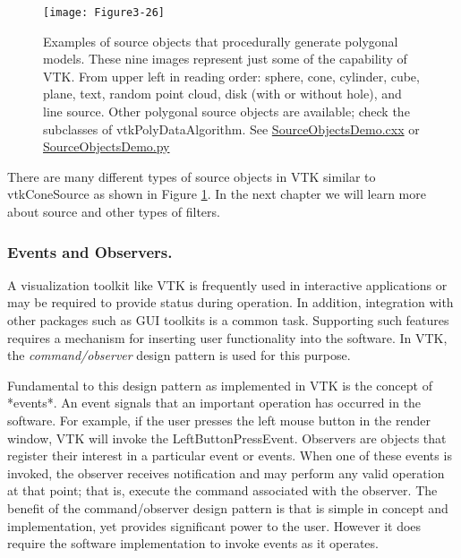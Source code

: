 \begin{figure}[!htb]
  \centering
  \texttt{[image: Figure3-26]}\\
  \caption{Examples of source objects that procedurally generate polygonal models. These nine images represent just some of the capability of VTK. From upper left in reading order: sphere, cone, cylinder, cube, plane, text, random point cloud, disk (with or without hole), and line source. Other polygonal source objects are available; check the subclasses of vtkPolyDataAlgorithm. See  \href{https://lorensen.github.io/VTKExamples/site/Cxx/GeometricObjects/SourceObjectsDemo/}{SourceObjectsDemo.cxx} or \href{https://lorensen.github.io/VTKExamples/site/Python/GeometricObjects/SourceObjectsDemo/}{SourceObjectsDemo.py}}\label{fig:Figure3-26}
\end{figure}

There are many different types of source objects in VTK similar to vtkConeSource as shown in Figure \ref{fig:Figure3-26}. In the next chapter we will learn more about source and other types of filters.

\subsubsection{Events and Observers.}
\label{sub:events_obdervers}
A visualization toolkit like VTK is frequently used in interactive applications or may be required to provide status during operation. In addition, integration with other packages such as GUI toolkits is a common task. Supporting such features requires a mechanism for inserting user functionality into the software. In VTK, the \emph{command/observer} design pattern \cite{Gamma95} is used for this purpose.

Fundamental to this design pattern as implemented in VTK is the concept of *events*. An event signals that an important operation has occurred in the software. For example, if the user presses the left mouse button in the render window, VTK will invoke the LeftButtonPressEvent. Observers are objects that register their interest in a particular event or events. When one of these events is invoked, the observer receives notification and may perform any valid operation at that point; that is, execute the command associated with the observer. The benefit of the command/observer design pattern is that is simple in concept and implementation, yet provides significant power to the user. However it does require the software implementation to invoke events as it operates.

